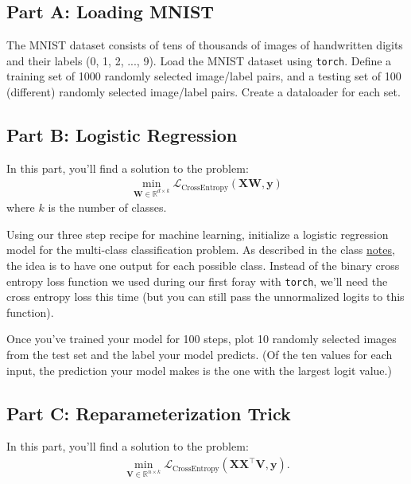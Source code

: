 \documentclass{article}
\begin{document}
\subsection*{Part A: Loading MNIST}

The MNIST dataset consists of tens of thousands of images of handwritten digits and their labels (0, 1, 2, ..., 9).
Load the MNIST dataset using \texttt{torch}.
Define a training set of 1000 randomly selected image/label pairs, and a testing set of 100 (different) randomly selected image/label pairs.
Create a dataloader for each set.

\subsection*{Part B: Logistic Regression}

In this part, you'll find a solution to the problem:
\begin{align}
    \min_{\mathbf{W} \in \mathbb{R}^{d \times k}}
    \mathcal{L}_{\text{CrossEntropy}}
    (\mathbf{XW}, \mathbf{y})
\end{align}
where $k$ is the number of classes.

Using our three step recipe for machine learning, initialize a logistic regression model for the multi-class classification problem.
As described in the class \href{https://www.rtealwitter.com/datamining2025/notes/LogisticRegression.html#multiple-classes}{notes}, the idea is to have one output for each possible class.
Instead of the binary cross entropy loss function we used during our first foray with \texttt{torch},
we'll need the cross entropy loss this time (but you can still pass the unnormalized logits to this function).

Once you've trained your model for 100 steps, plot 10 randomly selected images from the test set and the label your model predicts.
(Of the ten values for each input, the prediction your model makes is the one with the largest logit value.)

\subsection*{Part C: Reparameterization Trick}

In this part, you'll find a solution to the problem:
\begin{align}
    \min_{\mathbf{V} \in \mathbb{R}^{n \times k}}
    \mathcal{L}_{\text{CrossEntropy}}
    (\mathbf{XX^\top V}, \mathbf{y}).
\end{align}
\end{document}
